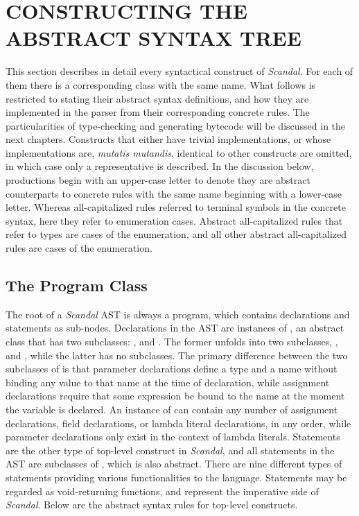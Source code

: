 \chapter{CONSTRUCTING THE ABSTRACT SYNTAX TREE}

This section describes in detail every syntactical construct of \emph{Scandal}. For each of them there is a corresponding  class with the same name. What follows is restricted to stating their abstract syntax definitions, and how they are implemented in the parser from their corresponding concrete rules. The particularities of type-checking and generating bytecode will be discussed in the next chapters. Constructs that either have trivial implementations, or whose implementations are, \emph{mutatis mutandis}, identical to other constructs are omitted, in which case only a representative is described. In the discussion below, productions begin with an upper-case letter to denote they are abstract counterparts to concrete rules with the same name beginning with a lower-case letter. Whereas all-capitalized rules referred to terminal symbols in the concrete syntax, here they refer to enumeration cases. Abstract all-capitalized rules that refer to types are cases of the  enumeration, and all other abstract all-capitalized rules are cases of the  enumeration.

\section{The Program Class}

The root of a \emph{Scandal} AST is always a program, which contains declarations and statements as sub-nodes. Declarations in the AST are instances of , an abstract class that has two subclasses: , and . The former unfolds into two subclasses, , and , while the latter has no subclasses. The primary difference between the two subclasses of  is that parameter declarations define a type and a name without binding any value to that name at the time of declaration, while assignment declarations require that some expression be bound to the name at the moment the variable is declared. An instance of  can contain any number of assignment declarations, field declarations, or lambda literal declarations, in any order, while parameter declarations only exist in the context of lambda literals. Statements are the other type of top-level construct in \emph{Scandal}, and all statements in the AST are subclasses of , which is also abstract. There are nine different types of statements providing various functionalities to the language. Statements may be regarded as void-returning functions, and represent the imperative side of \emph{Scandal}. Below are the abstract syntax rules for top-level constructs.

